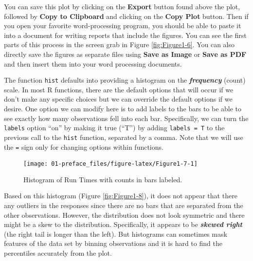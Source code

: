 \documentclass[
]{book}
\newenvironment{Shaded}{\begin{snugshade}}{\end{snugshade}}
\newcommand{\AttributeTok}[1]{\textcolor[rgb]{0.77,0.63,0.00}{#1}}
\newcommand{\FunctionTok}[1]{\textcolor[rgb]{0.00,0.00,0.00}{#1}}
\newcommand{\NormalTok}[1]{#1}
\newcommand{\SpecialCharTok}[1]{\textcolor[rgb]{0.00,0.00,0.00}{#1}}
\begin{document}
\indent You can save this plot by clicking on the \textbf{Export} button found above
the plot, followed by \textbf{Copy to Clipboard} and clicking on the
\textbf{Copy Plot} button. Then if you open your
favorite word-processing program, you should be able to paste it into a
document for writing reports that include the figures. You can see the first
parts of this process in the screen grab in Figure \ref{fig:Figure1-6}. You can also directly save the figures as separate files using
\textbf{Save as Image} or \textbf{Save as PDF} and then insert them into your word
processing documents.

\indent The function \texttt{hist} defaults into providing a histogram on the \textbf{\emph{frequency}}
(count) scale. In most R functions, there are the default options that will
occur if we don't make any specific choices but we
can override the default options if we desire. One option we can modify here is
to add labels to the bars to be able to see exactly how many observations fell
into each bar. Specifically, we can turn the \texttt{labels} option ``on'' by making it true (``T'') by adding \texttt{labels\ =\ T} to the previous call to the \texttt{hist} function, separated by a comma. Note that we will use the \texttt{=} sign only for changing options within functions.

\begin{Shaded}
\end{Shaded}



\begin{figure}[ht!]

{\centering \texttt{[image: 01-preface\_files/figure-latex/Figure1-7-1]} 

}

\caption{Histogram of Run Times with counts in bars labeled.}\label{fig:Figure1-7}
\end{figure}

\indent Based on this histogram (Figure \ref{fig:Figure1-8}), it does not appear that there any outliers in the responses
since there are no bars that are separated from the other observations. However,
the distribution does not look symmetric and there might be a skew to the
distribution. Specifically, it appears to be \textbf{\emph{skewed right}} (the right tail is longer than the left). But histograms can sometimes mask features of
the data set by binning observations and it is hard to find the percentiles
accurately from the plot.
\end{document}
